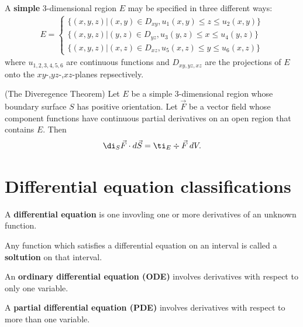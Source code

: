 \documentclass{article}
\begin{document}
\begin{definition}
	A \textbf{simple} 3-dimensional region $E$ may be specified in three different ways:
	\begin{align*}
		E=\begin{cases}
			\{(x,y,z)|(x,y)\in D_{xy}, u_1(x,y)\leq z \leq u_2(x,y)\} \\
			\{(x,y,z)|(y,z)\in D_{yz}, u_3(y,z)\leq x \leq u_4(y,z)\} \\
			\{(x,y,z)|(x,z)\in D_{xz}, u_5(x,z)\leq y \leq u_6(x,z)\}
		\end{cases}
	\end{align*}
	where $u_{1,2,3,4,5,6}$ are continuous functions and $D_{xy,yz,xz}$ are the projections
	of $E$ onto the $xy$-,$yz$-,$xz$-planes repsectively.
\end{definition}
\begin{theorem}(The Diveregence Theorem)
	Let $E$ be a simple 3-dimensional region whose boundary surface $S$ has positive
	orientation. Let $\vec F$ be a vector field whose component functions have continuous
	partial derivatives on an open region that contains $E$. Then
	\begin{align*}
		\di_S \vec F\cdot d\vec S = \ti_E \div\vec F\:dV.
	\end{align*}
\end{theorem}



\section{Differential equation classifications}



\begin{definition}
	A \textbf{differential equation} is one invovling one or more derivatives of an unknown function.
\end{definition}

\begin{definition}
	Any function which satisfies a differential equation on an interval is called a \textbf{soltution} on that interval.
\end{definition}

\begin{definition}
	An \textbf{ordinary differential equation (ODE)} involves derivatives with respect to only one variable.
\end{definition}

\begin{definition}
	A \textbf{partial differential equation (PDE)} involves derivatives with respect to more than one variable.
\end{definition}
\end{document}
